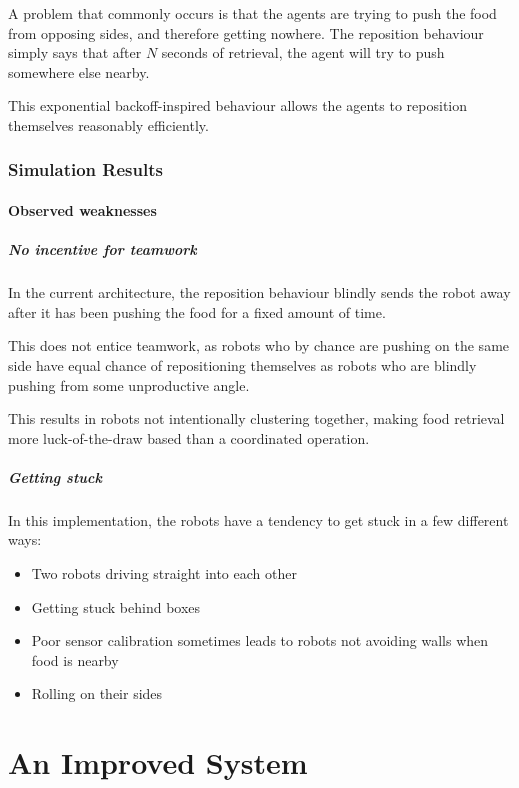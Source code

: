 \documentclass[a4paper]{article}
\begin{document}
A problem that commonly occurs is that the agents are trying to push the food from opposing sides, and therefore getting nowhere.
The reposition behaviour simply says that after $ N $ seconds of retrieval, the agent will try to push somewhere else nearby.

This exponential backoff-inspired behaviour allows the agents to reposition themselves reasonably efficiently.

\section{Simulation Results}


\subsection{Observed weaknesses}
\subsubsection{No incentive for teamwork}
In the current architecture, the reposition behaviour blindly sends the robot away after it has been pushing the food for a fixed amount of time.

This does not entice teamwork, as robots who by chance are pushing on the same side have equal chance of repositioning themselves as robots who are blindly pushing from some unproductive angle.

This results in robots not intentionally clustering together, making food retrieval more luck-of-the-draw based than a coordinated operation.

\subsubsection{Getting stuck}
In this implementation, the robots have a tendency to get stuck in a few different ways:

\begin{itemize}
	\item Two robots driving straight into each other
	\item Getting stuck behind boxes
	\item Poor sensor calibration sometimes leads to robots not avoiding walls when food is nearby
	\item Rolling on their sides
\end{itemize}

\part{An Improved System}
\end{document}
